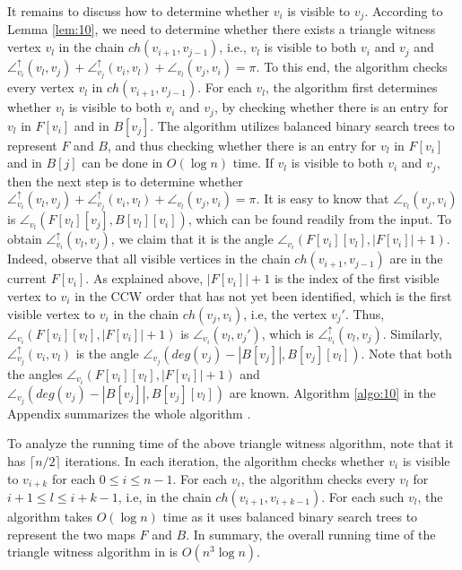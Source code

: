 \documentclass[11pt]{article}
\def\sangle{\angle^{\uparrow}}
\begin{document}
It remains to discuss how to determine whether $v_i$ is visible to
$v_{j}$. According to Lemma \ref{lem:10}, we need to determine
whether there exists a triangle witness vertex $v_l$ in the chain 
$ch(v_{i+1},v_{j-1})$, i.e., $v_l$ is visible to both $v_i$ and $v_{j}$ and 
$\sangle_{v_i}(v_l,v_j)+\sangle_{v_j}(v_i,v_l)+\angle_{v_l}(v_j,v_i)=\pi$. 
To this end, the algorithm checks every vertex $v_l$ in
$ch(v_{i+1},v_{j-1})$. For each $v_l$, the algorithm first determines 
whether $v_l$ is visible to both
$v_i$ and $v_{j}$, by checking whether there is an entry for $v_l$ in $F[v_i]$
and in $B[v_{j}]$. The algorithm utilizes balanced binary search trees
to represent $F$ and $B$, and thus checking whether there is an entry
for $v_l$ in $F[v_i]$ and in $B[j]$ can be done in $O(\log n)$ time. If $v_l$ is
visible to both $v_i$ and $v_{j}$, then the next step is to determine whether
$\sangle_{v_i}(v_l,v_j)+\sangle_{v_j}(v_i,v_l)+\angle_{v_l}(v_j,v_i)=\pi$. 
It is easy to know that $\angle_{v_l}(v_j,v_i)$ is 
$\angle_{v_l}(F[v_l][v_{j}],B[v_l][v_i])$, which can be found readily from the input.
To obtain $\sangle_{v_i}(v_l,v_j)$, we claim that it is the angle
$\angle_{v_i}(F[v_i][v_l],|F[v_i]|+1)$. Indeed, observe that all visible
vertices in the chain $ch(v_{i+1},v_{j-1})$ are in the current
$F[v_i]$. As explained above, $|F[v_i]|+1$ is the index of the first visible  
vertex to $v_i$ in the CCW order that has not yet been identified, which is
the first visible vertex to $v_i$ in the chain $ch(v_j,v_i)$, i.e, the
vertex $v_j'$. Thus, $\angle_{v_i}(F[v_i][v_l],|F[v_i]|+1)$ is
$\angle_{v_i}(v_l,v_j')$, which is $\sangle_{v_i}(v_l,v_j)$.
Similarly, $\sangle_{v_j}(v_i,v_l)$ is the angle
$\angle_{v_j}(deg(v_j)-|B[v_j]|,B[v_j][v_l])$. Note that both the angles
$\angle_{v_i}(F[v_i][v_l],|F[v_i]|+1)$ and
$\angle_{v_j}(deg(v_j)-|B[v_j]|,B[v_j][v_l])$
are known. Algorithm \ref{algo:10} in the Appendix summarizes the whole 
algorithm \cite{ref:DisserRe10}.

To analyze the running time of the above triangle witness algorithm,
note that it has $\lceil n/2\rceil$ iterations. In each iteration, the
algorithm checks whether $v_i$ is visible to $v_{i+k}$ for
each $0\leq i\leq n-1$. For each $v_i$, the algorithm checks every $v_l$
for $i+1\leq l\leq i+k-1$, i.e, in the chain $ch(v_{i+1},v_{i+k-1})$. 
For each such $v_l$, the algorithm takes $O(\log n)$ time as it 
uses balanced binary search trees to represent the two maps $F$ and $B$. 
In summary, the overall running time of the triangle witness algorithm in
\cite{ref:DisserRe10} is $O(n^3\log n)$. 
\end{document}
